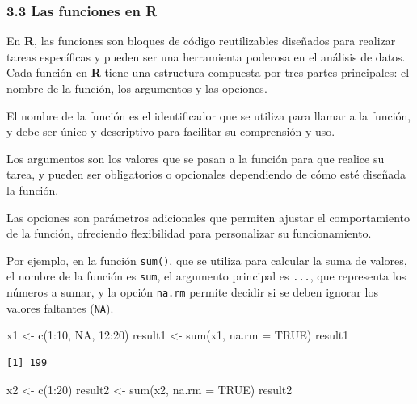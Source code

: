 \documentclass[
  letterpaper,
  DIV=11,
  numbers=noendperiod]{scrartcl}
\newenvironment{Shaded}{\begin{snugshade}}{\end{snugshade}}
\newcommand{\AttributeTok}[1]{\textcolor[rgb]{0.40,0.45,0.13}{#1}}
\newcommand{\ConstantTok}[1]{\textcolor[rgb]{0.56,0.35,0.01}{#1}}
\newcommand{\DecValTok}[1]{\textcolor[rgb]{0.68,0.00,0.00}{#1}}
\newcommand{\FunctionTok}[1]{\textcolor[rgb]{0.28,0.35,0.67}{#1}}
\newcommand{\NormalTok}[1]{\textcolor[rgb]{0.00,0.23,0.31}{#1}}
\newcommand{\OtherTok}[1]{\textcolor[rgb]{0.00,0.23,0.31}{#1}}
\newcommand{\SpecialCharTok}[1]{\textcolor[rgb]{0.37,0.37,0.37}{#1}}
\begin{document}
\hypertarget{las-funciones-en-r}{%
\subsubsection{3.3 Las funciones en R}\label{las-funciones-en-r}}

En \textbf{R}, las funciones son bloques de código reutilizables
diseñados para realizar tareas específicas y pueden ser una herramienta
poderosa en el análisis de datos. Cada función en \textbf{R} tiene una
estructura compuesta por tres partes principales: el nombre de la
función, los argumentos y las opciones.

El nombre de la función es el identificador que se utiliza para llamar a
la función, y debe ser único y descriptivo para facilitar su comprensión
y uso.

Los argumentos son los valores que se pasan a la función para que
realice su tarea, y pueden ser obligatorios o opcionales dependiendo de
cómo esté diseñada la función.

Las opciones son parámetros adicionales que permiten ajustar el
comportamiento de la función, ofreciendo flexibilidad para personalizar
su funcionamiento.

Por ejemplo, en la función \texttt{sum()}, que se utiliza para calcular
la suma de valores, el nombre de la función es \texttt{sum}, el
argumento principal es \texttt{...}, que representa los números a sumar,
y la opción \texttt{na.rm} permite decidir si se deben ignorar los
valores faltantes (\texttt{NA}).

\begin{Shaded}
\begin{Highlighting}[]
\NormalTok{x1 }\OtherTok{\textless{}{-}} \FunctionTok{c}\NormalTok{(}\DecValTok{1}\SpecialCharTok{:}\DecValTok{10}\NormalTok{, }\ConstantTok{NA}\NormalTok{, }\DecValTok{12}\SpecialCharTok{:}\DecValTok{20}\NormalTok{)}
\NormalTok{result1 }\OtherTok{\textless{}{-}} \FunctionTok{sum}\NormalTok{(x1, }\AttributeTok{na.rm =} \ConstantTok{TRUE}\NormalTok{)}
\NormalTok{result1}
\end{Highlighting}
\end{Shaded}

\begin{verbatim}
[1] 199
\end{verbatim}

\begin{Shaded}
\begin{Highlighting}[]
\NormalTok{x2 }\OtherTok{\textless{}{-}} \FunctionTok{c}\NormalTok{(}\DecValTok{1}\SpecialCharTok{:}\DecValTok{20}\NormalTok{)}
\NormalTok{result2 }\OtherTok{\textless{}{-}} \FunctionTok{sum}\NormalTok{(x2, }\AttributeTok{na.rm =} \ConstantTok{TRUE}\NormalTok{)}
\NormalTok{result2}
\end{Highlighting}
\end{Shaded}
\end{document}
